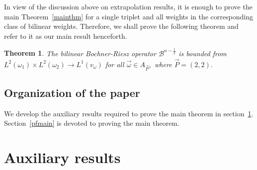 \documentclass[a4paper,12pt]{amsart}
\newtheorem{theorem}{Theorem}[section]
\begin{document}
In view of the discussion above on extrapolation results, it is enough to prove the main Theorem~\ref{mainthm} for a single triplet and all weights in the corresponding class of bilinear weights. Therefore, we shall prove the following theorem and refer to it as our main result henceforth. 
\begin{theorem} \label{mainthm1} The bilinear Bochner-Riesz operator $\mathcal {B}^{n-\frac{1}{2}}$ is bounded from  $L^{2}(\omega_{1})\times L^{2}(\omega_{2})\rightarrow L^{1}(v_{\omega})$ for all $\vec{\omega}\in A_{\vec{P}},$ where $\vec{P}=(2,2).$
\end{theorem}

\subsection{Organization of the paper} We develop the auxiliary results required to prove the main theorem in section~\ref{main2:sec}. Section~\ref{pfmain} is devoted to proving the main theorem. 
\section{Auxiliary results} \label{main2:sec}
\end{document}
